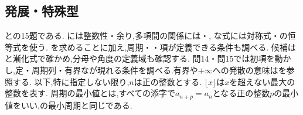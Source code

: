 \subsection{発展・特殊型}\label{節：発展・特殊型}
との15題である.
には整数性・余り,多項間の関係には・,
な式には対称式・の恒等式を使う.
を求めることに加え,周期・・項が定義できる条件も調べる.
候補はと漸化式で確かめ,分母や角度の定義域も確認する.
問14・問15では初項を動かし,定・周期列・有界なが現れる条件を調べる.有界や$+\infty$への発散の意味はを参照する.
以下,特に指定しない限り,$n$は正の整数とする.
$\lfloor x\rfloor$は$x$を超えない最大の整数を表す.
周期の最小値とは,すべての添字で$a_{n+p}=a_n$となる正の整数$p$の最小値をいい,の最小周期と同じである.

